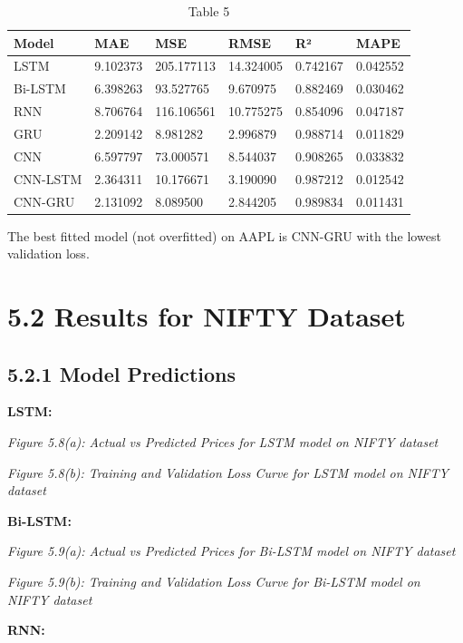 \documentclass[12pt,a4paper]{report}
\begin{document}
\begin{table}[htbp]
\centering
\begin{tabular}{|l|l|l|l|l|l|}
\hline
\textbf{Model} & \textbf{MAE} & \textbf{MSE} & \textbf{RMSE} & \textbf{R²} & \textbf{MAPE} \\
\hline
LSTM & 9.102373 & 205.177113 & 14.324005 & 0.742167 & 0.042552 \\
\hline
Bi-LSTM & 6.398263 & 93.527765 & 9.670975 & 0.882469 & 0.030462 \\
\hline
RNN & 8.706764 & 116.106561 & 10.775275 & 0.854096 & 0.047187 \\
\hline
GRU & 2.209142 & 8.981282 & 2.996879 & 0.988714 & 0.011829 \\
\hline
CNN & 6.597797 & 73.000571 & 8.544037 & 0.908265 & 0.033832 \\
\hline
CNN-LSTM & 2.364311 & 10.176671 & 3.190090 & 0.987212 & 0.012542 \\
\hline
CNN-GRU & 2.131092 & 8.089500 & 2.844205 & 0.989834 & 0.011431 \\
\hline
\end{tabular}
\caption{Table 5}
\label{tab:table5}
\end{table}

The best fitted model (not overfitted) on AAPL is CNN-GRU with the lowest validation loss.

\section{5.2 Results for NIFTY Dataset}
\subsection{5.2.1 Model Predictions}
\textbf{LSTM:}

\begin{center}
\textit{Figure 5.8(a): Actual vs Predicted Prices for LSTM model on NIFTY dataset}
\end{center}
\begin{center}
\textit{Figure 5.8(b): Training and Validation Loss Curve for LSTM model on NIFTY data}\textit{set}
\end{center}
\textbf{Bi-LSTM:}

\begin{center}
\textit{Figure 5.9(a): Actual vs Predicted Prices for Bi-LSTM model on NIFTY dataset}
\end{center}
\begin{center}
\textit{Figure 5.9(b): Training and Validation Loss Curve for Bi-LSTM model on NIFTY data}\textit{set}
\end{center}
\textbf{RNN:}
\end{document}
